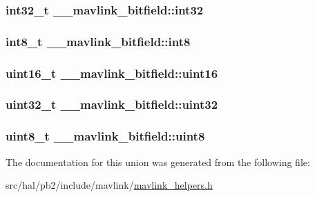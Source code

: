 \subsubsection[{\texorpdfstring{int32}{int32}}]{\setlength{\rightskip}{0pt plus 5cm}int32\+\_\+t \+\_\+\+\_\+mavlink\+\_\+bitfield\+::int32}\hypertarget{union____mavlink__bitfield_a07bd702e8b91679a25e632ad90d0a1ec}{}\label{union____mavlink__bitfield_a07bd702e8b91679a25e632ad90d0a1ec}
\subsubsection[{\texorpdfstring{int8}{int8}}]{\setlength{\rightskip}{0pt plus 5cm}int8\+\_\+t \+\_\+\+\_\+mavlink\+\_\+bitfield\+::int8}\hypertarget{union____mavlink__bitfield_a50a846d427d7a1d7dc79235c87597622}{}\label{union____mavlink__bitfield_a50a846d427d7a1d7dc79235c87597622}
\subsubsection[{\texorpdfstring{uint16}{uint16}}]{\setlength{\rightskip}{0pt plus 5cm}uint16\+\_\+t \+\_\+\+\_\+mavlink\+\_\+bitfield\+::uint16}\hypertarget{union____mavlink__bitfield_a0ca76ce4a09ee26387e50b6702c17894}{}\label{union____mavlink__bitfield_a0ca76ce4a09ee26387e50b6702c17894}
\subsubsection[{\texorpdfstring{uint32}{uint32}}]{\setlength{\rightskip}{0pt plus 5cm}uint32\+\_\+t \+\_\+\+\_\+mavlink\+\_\+bitfield\+::uint32}\hypertarget{union____mavlink__bitfield_ab43ed56310c2d778ebaa7a5a21cb6587}{}\label{union____mavlink__bitfield_ab43ed56310c2d778ebaa7a5a21cb6587}
\subsubsection[{\texorpdfstring{uint8}{uint8}}]{\setlength{\rightskip}{0pt plus 5cm}uint8\+\_\+t \+\_\+\+\_\+mavlink\+\_\+bitfield\+::uint8}\hypertarget{union____mavlink__bitfield_ade669a5f63c53f0d61f636eff94417c0}{}\label{union____mavlink__bitfield_ade669a5f63c53f0d61f636eff94417c0}


The documentation for this union was generated from the following file\+:\begin{DoxyCompactItemize}
\item 
src/hal/pb2/include/mavlink/\hyperlink{mavlink__helpers_8h}{mavlink\+\_\+helpers.\+h}\end{DoxyCompactItemize}
